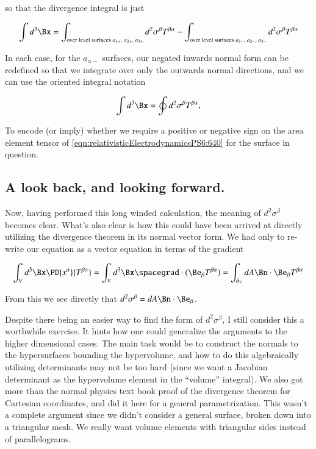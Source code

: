so that the divergence integral is just

\begin{equation}\label{eqn:relativisticElectrodynamicsPS6:560}
\int d^3 \Bx = 
\int_{\text{over level surfaces $a_{1+}$, $a_{2+}$, $a_{3+}$}} d^2 \sigma^\beta T^{\beta \alpha}
-\int_{\text{over level surfaces $a_{1-}$, $a_{2-}$, $a_{3-}$}} d^2 \sigma^\beta T^{\beta \alpha}
\end{equation}

In each case, for the $a_{\alpha-}$ surfaces, our negated inwards normal form can be redefined so that we integrate over only the outwards normal directions, and we can use the oriented integral notation

\begin{equation}\label{eqn:relativisticElectrodynamicsPS6:580}
\int d^3 \Bx = \oint d^2 \sigma^\beta T^{\beta \alpha},
\end{equation}

To encode (or imply) whether we require a positive or negative sign on the area element tensor of \ref{eqn:relativisticElectrodynamicsPS6:640} for the surface in question.

\subsection{A look back, and looking forward.}

Now, having performed this long winded calculation, the meaning of $d^2 \sigma^\beta$ becomes clear.  What's also clear is how this could have been arrived at directly utilizing the divergence theorem in its normal vector form.  We had only to re-write our equation as a vector equation in terms of the gradient

\begin{equation}\label{eqn:relativisticElectrodynamicsPS6:600}
\int_V d^3 \Bx \PD{x^\alpha}{T^{\beta \alpha}} = \int_V d^3 \Bx \spacegrad \cdot (\Be_\beta T^{\beta \alpha}) = \int_{\partial_V} dA \Bn \cdot \Be_\beta T^{\beta \alpha}
\end{equation}

From this we see directly that $d^2 \sigma^\beta = dA \Bn \cdot \Be_\beta$.

Despite there being an easier way to find the form of $d^2 \sigma^\beta$, I still consider this a worthwhile exercise.  It hints how one could generalize the arguments to the higher dimensional cases.  The main task would be to construct the normals to the hypersurfaces bounding the hypervolume, and how to do this algebraically utilizing determinants may not be too hard (since we want a Jacobian determinant as the hypervolume element in the ``volume'' integral).  We also got more than the normal physics text book proof of the divergence theorem for Cartesian coordinates, and did it here for a general parametrization.  This wasn't a complete argument since we didn't consider a general surface, broken down into a triangular mesh.  We really want volume elements with triangular sides instead of parallelograms.

\EndNoBibArticle
